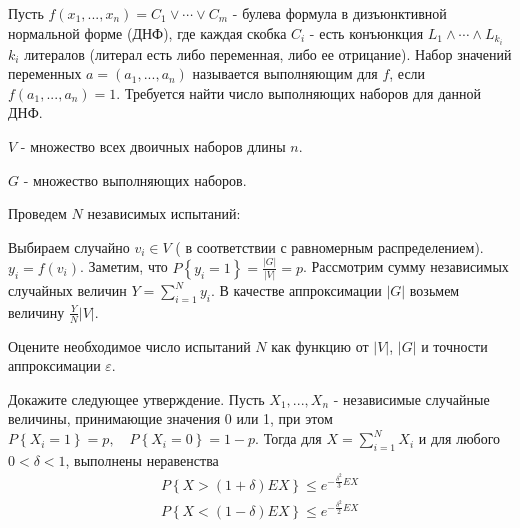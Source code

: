 \begin{problem}

Пусть $f(x_{1} ,...,x_{n} )=C_{1} \vee \cdots \vee C_{m} $ - булева формула в дизъюнктивной нормальной форме (ДНФ), где каждая скобка $C_{i} $ - есть конъюнкция $L_{1} \wedge \cdots \wedge L_{k_{i} } $ $k_{i} $ литералов (литерал есть либо переменная, либо ее отрицание). Набор значений переменных $a=(a_{1} ,...,a_{n} )$ называется выполняющим для $f$, если $f(a_{1} ,...,a_{n} )=1$. Требуется найти число выполняющих наборов для данной ДНФ.

\noindent $V$ - множество всех двоичных наборов длины $n$.

\noindent $G$ - множество выполняющих наборов.


\noindent  Проведем $N$ независимых испытаний:

\noindent Выбираем случайно $v_{i} \in V$ ( в соответствии с равномерным распределением).
\noindent $y_{i} =f(v_{i} )$. Заметим, что $P\left\{y_{i} =1\right\}=\frac{\left|G\right|}{\left|V\right|} =p$.
Рассмотрим сумму независимых случайных величин $Y=\sum _{i=1}^{N}y_{i}  $. В качестве аппроксимации $\left|G\right|$ возьмем величину $\frac{Y}{N} \left|V\right|$.

\noindent Оцените необходимое число испытаний $N$ как функцию от $|V|$, $|G|$ и точности аппроксимации $\varepsilon$. 

\begin{ordre}
Докажите следующее утверждение. Пусть $X_{1} ,...,X_{n} $ - независимые случайные величины, принимающие значения 0 или 1, при этом $P\left\{X_{i} =1\right\}=p,\quad P\left\{X_{i} =0\right\}=1-p$. Тогда для $X=\sum _{i=1}^{N}X_{i}  $ и для любого $0<\delta <1$, выполнены неравенства
\[\begin{array}{l} {P\left\{X>(1+\delta )EX\right\}\le e^{-\frac{\delta ^{2} }{3} EX} } \\ {P\left\{X<(1-\delta )EX\right\}\le e^{-\frac{\delta ^{2} }{2} EX} } \end{array}\] 
\end{ordre}

\end{problem}


